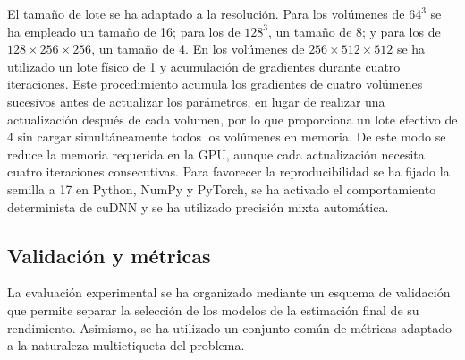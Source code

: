 El tamaño de lote se ha adaptado a la resolución. Para los volúmenes de $64^3$ se ha empleado un tamaño de 16; para los de $128^3$, un tamaño de 8; y para los de $128 \times 256 \times 256$, un tamaño de 4. En los volúmenes de $256 \times 512 \times 512$ se ha utilizado un lote físico de 1 y acumulación de gradientes durante cuatro iteraciones. Este procedimiento acumula los gradientes de cuatro volúmenes sucesivos antes de actualizar los parámetros, en lugar de realizar una actualización después de cada volumen, por lo que proporciona un lote efectivo de 4 sin cargar simultáneamente todos los volúmenes en memoria. De este modo se reduce la memoria requerida en la GPU, aunque cada actualización necesita cuatro iteraciones consecutivas. Para favorecer la reproducibilidad se ha fijado la semilla a 17 en Python, NumPy y PyTorch, se ha activado el comportamiento determinista de cuDNN y se ha utilizado precisión mixta automática.


\subsection{Validación y métricas}

La evaluación experimental se ha organizado mediante un esquema de validación que permite separar la selección de los modelos de la estimación final de su rendimiento. Asimismo, se ha utilizado un conjunto común de métricas adaptado a la naturaleza multietiqueta del problema.



